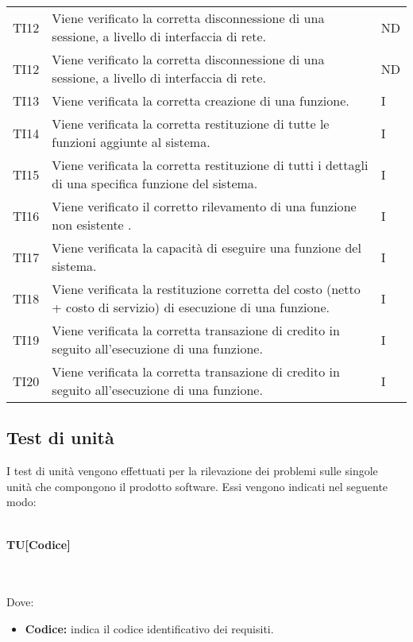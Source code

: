 \begin{longtable}{|C{1.5cm}|C{10cm}|C{1.5cm}|}
	TI12 &
	Viene verificato la corretta disconnessione di una sessione, a livello di interfaccia di rete.  &
	ND \\
	
	TI12 &
	Viene verificato la corretta disconnessione di una sessione, a livello di interfaccia di rete.  &
	ND \\
	
	TI13 &
	Viene verificata la corretta creazione di una funzione.  &
	I \\
	
	TI14 &
	Viene verificata la corretta restituzione di tutte le funzioni aggiunte al sistema.  &
	I \\
	
	TI15 &
	Viene verificata la corretta restituzione di tutti i dettagli di una specifica funzione del sistema.  &
	I \\
	
	TI16 &
	Viene verificato il corretto rilevamento di una funzione non esistente .  &
	I \\
	
	TI17 &
	Viene verificata la capacità di eseguire una funzione del sistema.  &
	I \\
	
	TI18 &
	Viene verificata la restituzione corretta del costo (netto + costo di servizio) di esecuzione di una funzione.  &
	I \\
	
	TI19 &
	Viene verificata la corretta transazione di credito in seguito all'esecuzione di una funzione.  &
	I \\

	TI20 &
	Viene verificata la corretta transazione di credito in seguito all'esecuzione di una funzione.  &
	I \\
\end{longtable}

\newpage
\subsection{Test di unità}
I test di unità vengono effettuati per la rilevazione dei problemi sulle singole unità che compongono il prodotto software. Essi vengono indicati nel seguente modo:\\\\
\centerline{\textbf{TU[Codice]}}\\\\
Dove:
\begin{itemize}
	\item \textbf{Codice:} indica il codice identificativo dei requisiti.
\end{itemize}


